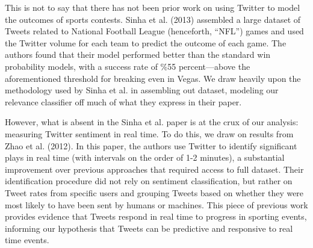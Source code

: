 \documentclass[12pt]{article}
\begin{document}
\begin{doublespacing}
This is not to say that there has not been prior work on using Twitter to model the outcomes of sports contests. Sinha et al. (2013) assembled a large dataset of Tweets related to National Football League (henceforth, ``NFL'') games and used the Twitter volume for each team to predict the outcome of each game. The authors found that their model performed better than the standard win probability models, with a success rate of \%55 percent---above the aforementioned threshold for breaking even in Vegas. We draw heavily upon the methodology used by Sinha et al. in assembling out dataset, modeling our relevance classifier off much of what they express in their paper.  

However, what is absent in the Sinha et al. paper is at the crux of our analysis: measuring Twitter sentiment in real time. To do this, we draw on results from Zhao et al. (2012). In this paper, the authors use Twitter to identify significant plays in real time (with intervals on the order of 1-2 minutes), a substantial improvement over previous approaches that required access to full dataset. Their identification procedure did not rely on sentiment classification, but rather on Tweet rates from specific users and grouping Tweets based on whether they were most likely to have been sent by humans or machines. This piece of previous work provides evidence that Tweets respond in real time to progress in sporting events, informing our hypothesis that Tweets can be predictive and responsive to real time events. 

\end{doublespacing}
\end{document}
